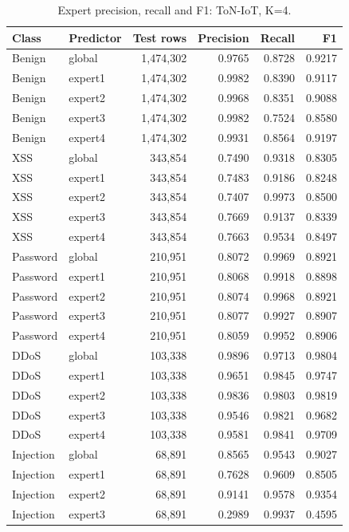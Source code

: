 \begin{longtable}{llrrrr}
\caption{Expert precision, recall and F1: ToN-IoT, K=4.}\\
\toprule
Class & Predictor & Test rows & Precision & Recall & F1 \\
\midrule\endhead
Benign & global & 1,474,302 & 0.9765 & 0.8728 & 0.9217 \\
Benign & expert1 & 1,474,302 & 0.9982 & 0.8390 & 0.9117 \\
Benign & expert2 & 1,474,302 & 0.9968 & 0.8351 & 0.9088 \\
Benign & expert3 & 1,474,302 & 0.9982 & 0.7524 & 0.8580 \\
Benign & expert4 & 1,474,302 & 0.9931 & 0.8564 & 0.9197 \\
XSS & global & 343,854 & 0.7490 & 0.9318 & 0.8305 \\
XSS & expert1 & 343,854 & 0.7483 & 0.9186 & 0.8248 \\
XSS & expert2 & 343,854 & 0.7407 & 0.9973 & 0.8500 \\
XSS & expert3 & 343,854 & 0.7669 & 0.9137 & 0.8339 \\
XSS & expert4 & 343,854 & 0.7663 & 0.9534 & 0.8497 \\
Password & global & 210,951 & 0.8072 & 0.9969 & 0.8921 \\
Password & expert1 & 210,951 & 0.8068 & 0.9918 & 0.8898 \\
Password & expert2 & 210,951 & 0.8074 & 0.9968 & 0.8921 \\
Password & expert3 & 210,951 & 0.8077 & 0.9927 & 0.8907 \\
Password & expert4 & 210,951 & 0.8059 & 0.9952 & 0.8906 \\
DDoS & global & 103,338 & 0.9896 & 0.9713 & 0.9804 \\
DDoS & expert1 & 103,338 & 0.9651 & 0.9845 & 0.9747 \\
DDoS & expert2 & 103,338 & 0.9836 & 0.9803 & 0.9819 \\
DDoS & expert3 & 103,338 & 0.9546 & 0.9821 & 0.9682 \\
DDoS & expert4 & 103,338 & 0.9581 & 0.9841 & 0.9709 \\
Injection & global & 68,891 & 0.8565 & 0.9543 & 0.9027 \\
Injection & expert1 & 68,891 & 0.7628 & 0.9609 & 0.8505 \\
Injection & expert2 & 68,891 & 0.9141 & 0.9578 & 0.9354 \\
Injection & expert3 & 68,891 & 0.2989 & 0.9937 & 0.4595 \\

\end{longtable}
